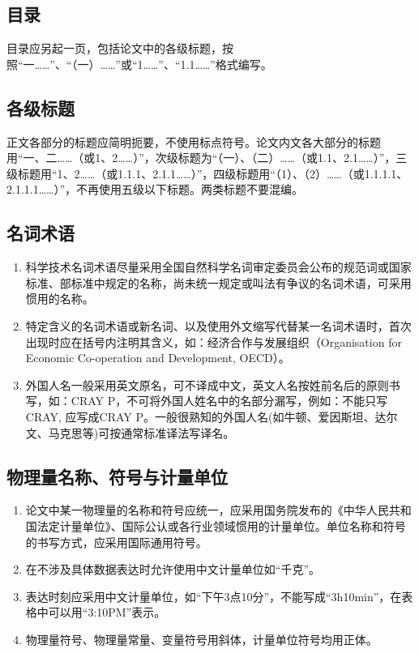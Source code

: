 \subsection{目录}

目录应另起一页，包括论文中的各级标题，按照``一……''、``（一）……''或``1……''、``1.1……''格式编写。

\subsection{各级标题}

正文各部分的标题应简明扼要，不使用标点符号。论文内文各大部分的标题用``一、二……（或1、2……）''，次级标题为``（一）、（二）……（或1.1、2.1……）''，三级标题用``1、2……（或1.1.1、2.1.1……）''，四级标题用``（1）、（2）……（或1.1.1.1、2.1.1.1……）''，不再使用五级以下标题。两类标题不要混编。

\subsection{名词术语}

\begin{enumerate}
    \item 科学技术名词术语尽量采用全国自然科学名词审定委员会公布的规范词或国家标准、部标准中规定的名称，尚未统一规定或叫法有争议的名词术语，可采用惯用的名称。
    \item 特定含义的名词术语或新名词、以及使用外文缩写代替某一名词术语时，首次出现时应在括号内注明其含义，如：经济合作与发展组织（Organisation for Economic Co-operation and Development, OECD）。
    \item 外国人名一般采用英文原名，可不译成中文，英文人名按姓前名后的原则书写，如：CRAY P，不可将外国人姓名中的名部分漏写，例如：不能只写CRAY, 应写成CRAY P。一般很熟知的外国人名(如牛顿、爱因斯坦、达尔文、马克思等)可按通常标准译法写译名。
\end{enumerate}

\subsection{物理量名称、符号与计量单位}

\begin{enumerate}
    \item 论文中某一物理量的名称和符号应统一，应采用国务院发布的《中华人民共和国法定计量单位》、国际公认或各行业领域惯用的计量单位。单位名称和符号的书写方式，应采用国际通用符号。
    \item 在不涉及具体数据表达时允许使用中文计量单位如``千克''。
    \item 表达时刻应采用中文计量单位，如``下午3点10分''，不能写成``3h10min''，在表格中可以用``3:10PM''表示。
    \item 物理量符号、物理量常量、变量符号用斜体，计量单位符号均用正体。
\end{enumerate}

